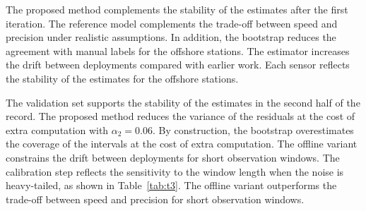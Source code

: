 The proposed method complements the stability of the estimates after
the first iteration.
The reference model complements the trade-off between
speed and precision under realistic assumptions.
In addition, the bootstrap reduces the agreement with manual labels
for the offshore stations.
The estimator increases the drift between deployments
compared with earlier work.
Each sensor reflects the stability of the estimates for the
offshore stations.

The validation set supports the stability of the estimates
in the second half of the record.
The proposed method reduces the variance of the residuals at the
cost of extra computation with $\alpha_{2} = 0.06$.
By construction, the bootstrap overestimates the coverage of
the intervals at the cost of extra computation.
The offline variant constrains the drift between deployments for
short observation windows.
The calibration step reflects the sensitivity to the window length
when the noise is heavy-tailed, as shown in Table~\ref{tab:t3}.
The offline variant outperforms the trade-off between
speed and precision for short observation windows.


